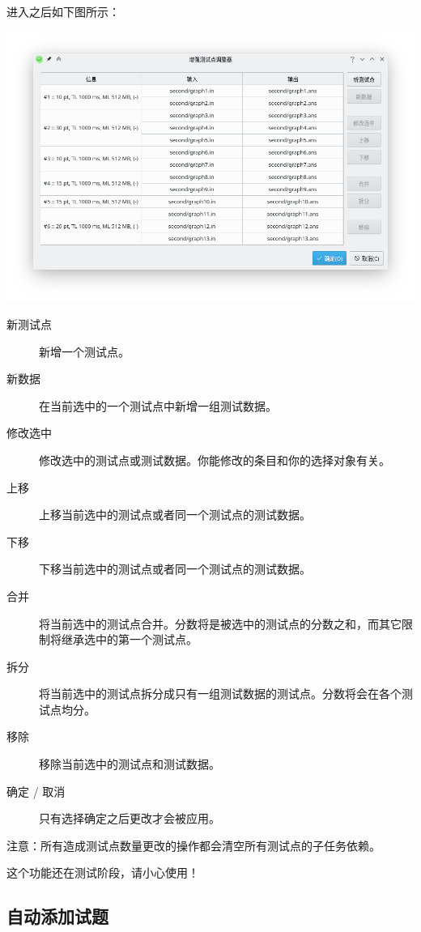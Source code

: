 \documentclass[UTF-8]{ctexart}
\begin{document}
			进入之后如下图所示：
			
			\begin{center}
			\includegraphics[scale=0.55]{pics/exttestcasemodifier.png}
			\end{center}
		
			\begin{description}
				\item[新测试点] 新增一个测试点。
				\item[新数据] 在当前选中的一个测试点中新增一组测试数据。
				\item[修改选中] 修改选中的测试点或测试数据。你能修改的条目和你的选择对象有关。
				\item[上移] 上移当前选中的测试点或者同一个测试点的测试数据。
				\item[下移] 下移当前选中的测试点或者同一个测试点的测试数据。
				\item[合并] 将当前选中的测试点合并。分数将是被选中的测试点的分数之和，而其它限制将继承选中的第一个测试点。
				\item[拆分] 将当前选中的测试点拆分成只有一组测试数据的测试点。分数将会在各个测试点均分。
				\item[移除] 移除当前选中的测试点和测试数据。
				\item[确定 / 取消] 只有选择确定之后更改才会被应用。
			\end{description}
			
			注意：所有造成测试点数量更改的操作都会清空所有测试点的子任务依赖。
			
			这个功能还在测试阶段，请小心使用！
		
		\subsection{自动添加试题}
		
\end{document}
